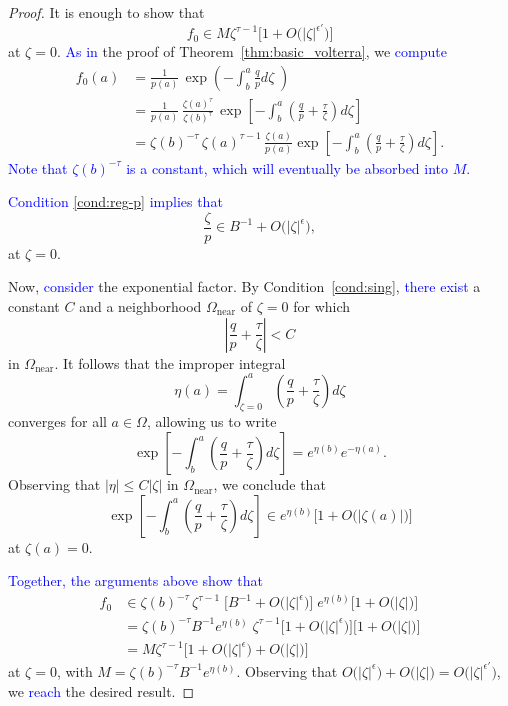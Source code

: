 \documentclass[review]{siamart220329}
\newcommand{\solproto}{f_0}
\newcommand{\domain}{\Omega}
\newcommand{\near}{\Omega_\text{near}}
\begin{document}
\begin{proof}
It is enough to show that
\[ \solproto \in M\zeta^{\tau-1} \Big[1 + O\big(|\zeta|^{\epsilon'}\big)\Big] \]
at $\zeta = 0$. \textcolor{blue}{As in} the proof of Theorem~\ref{thm:basic_volterra}, we \textcolor{blue}{compute}
\begin{align*}
\solproto(a)&=\frac{1}{p(a)}\, \exp\left(-\int_b^a\frac{q}{p} d\zeta\;\right)\\
& = \frac{1}{p(a)}\,\frac{\zeta(a)^{\tau}}{\zeta(b)^{\tau}}\,\exp\left[-\int_b^a \left(\frac{q}{p}+\frac{\tau}{\zeta}\right) d\zeta\right]\\
& = \zeta(b)^{-\tau}\,\zeta(a)^{\tau-1}\,\frac{\zeta(a)}{p(a)} \exp\left[-\int_b^a\left(\frac{q}{p}+\frac{\tau}{\zeta}\right) d\zeta\right].
\end{align*}
\textcolor{blue}{Note that $\zeta(b)^{-\tau}$ is a constant, which will eventually be absorbed into $M$.}

\textcolor{blue}{Condition \eqref{cond:reg-p} implies that}
\[ \frac{\zeta}{p} \in B^{-1} + O\big(|\zeta|^{\epsilon}\big), \]
at $\zeta = 0$.

Now, \textcolor{blue}{consider} the exponential factor. By Condition~\eqref{cond:sing}, \textcolor{blue}{there exist} a constant $C$ and a neighborhood $\domain_\text{near}$ of $\zeta = 0$ for which
\[ \left| \frac{q}{p}+\frac{\tau}{\zeta} \right| < C \]
in $\domain_\text{near}$. It follows that the improper integral
\[ \eta(a) = \int_{\zeta = 0}^a \left(\frac{q}{p}+\frac{\tau}{\zeta}\right) d\zeta \]
converges for all $a \in \domain$, allowing us to write
\[ \exp\left[-\int_b^a\left(\frac{q}{p}+\frac{\tau}{\zeta}\right) d\zeta\right] = e^{\eta(b)} e^{-\eta(a)}. \]
Observing that $|\eta| \le C |\zeta|$ in $\near$, we conclude that
\[ \exp\left[-\int_b^a\left(\frac{q}{p}+\frac{\tau}{\zeta}\right) d\zeta\right] \in e^{\eta(b)} \Big[ 1 + O\big(|\zeta(a)|\big) \Big] \]
at $\zeta(a) = 0$.

\textcolor{blue}{Together, the arguments above show that}
\begin{align*}
\solproto & \in \zeta(b)^{-\tau}\,\zeta^{\tau-1}\;\Big[ B^{-1} + O\big(|\zeta|^{\epsilon}\big) \Big]\;e^{\eta(b)} \Big[1 + O\big(|\zeta|\big) \Big] \\
& = \zeta(b)^{-\tau} B^{-1} e^{\eta(b)}\;\zeta^{\tau-1} \Big[ 1 + O\big(|\zeta|^{\epsilon}\big) \Big] \Big[1 + O\big(|\zeta|\big) \Big] \\
& = M\zeta^{\tau-1} \Big[ 1 + O\big(|\zeta|^{\epsilon}\big) + O\big(|\zeta|\big) \Big]
\end{align*}
at $\zeta = 0$, with $M = \zeta(b)^{-\tau} B^{-1} e^{\eta(b)}$. Observing that $O\big(|\zeta|^{\epsilon}\big) + O\big(|\zeta|\big) = O\big(|\zeta|^{\epsilon'}\big)$, we \textcolor{blue}{reach} the desired result.
\end{proof}
\end{document}
